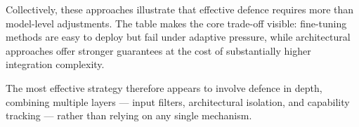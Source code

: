 \medskip

Collectively, these approaches illustrate that effective defence requires more
than model-level adjustments. The table makes the core trade-off visible:
fine-tuning methods are easy to deploy but fail under adaptive pressure, while
architectural approaches offer stronger guarantees at the cost of substantially
higher integration complexity.

The most effective strategy therefore appears to involve defence in depth,
combining multiple layers --- input filters, architectural isolation, and
capability tracking --- rather than relying on any single mechanism.